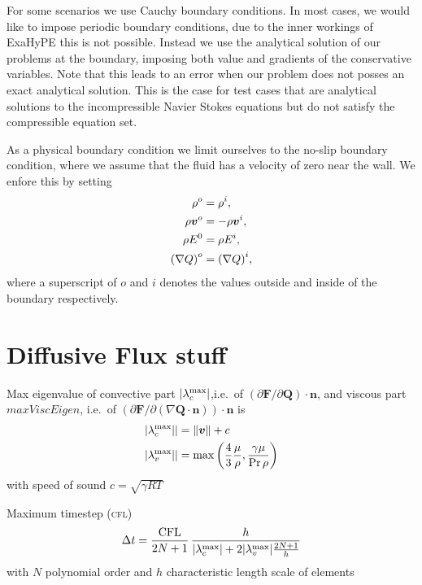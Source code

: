 For some scenarios we use Cauchy boundary conditions.
In most cases, we would like to impose periodic boundary conditions, due to the inner workings of ExaHyPE this is not possible.
Instead we use the analytical solution of our problems at the boundary, imposing both value and gradients of the conservative variables.
Note that this leads to an error when our problem does not posses an exact analytical solution.
This is the case for test cases that are analytical solutions to the incompressible Navier Stokes equations but do not satisfy the compressible equation set.

As a physical boundary condition we limit ourselves to the no-slip boundary condition, where we assume that the fluid has a velocity of zero near the wall.
We enfore this by setting
\begin{align}
  \label{eq:no-slip}
  \begin{split}
  \rho^o &= \rho^i, \\
  \rho \bm{v}^o &= -\rho \bm{v}^i, \\
  \rho E^0 &= \rho E^i,\\
  {(\nabla Q)}^o &= {(\nabla Q)}^i,
  \end{split}
\end{align}
where a superscript of $o$ and $i$ denotes the values outside and inside of the boundary respectively.


\section{Diffusive Flux stuff}
Max eigenvalue of convective part $\vert \lambda_c^{\text{max}} \vert$,i.e.\ of $\left( \partial \bm{F}/\partial \bm{Q}\right) \cdot \bm{n}$,
and viscous part $maxViscEigen$, i.e.\ of $\left( \partial \bm{F}/\partial \left( \nabla \bm{Q} \cdot \bm{n} \right)\right) \cdot \bm{n}$
is
\begin{align}
  \vert \lambda_c^{\text{max}} \vert \vert  &= \Vert \bm{v} \Vert + c\\
  \vert \lambda_v^{\text{max}} \vert \vert &= \max \left( \frac{4}{3} \frac{\mu}{\rho}
                                       , \frac{\gamma \mu}{\Pr \rho} \right)
\end{align}
with speed of sound $c = \sqrt{\gamma R T }$

Maximum timestep (\textsc{cfl})
\begin{equation}
 \Delta t = \frac{\text{CFL}}{2N + 1} \, \frac{h}{\vert \lambda_c^{\text{max}} \vert + 2 \vert \lambda_v^{\text{max}} \vert \frac{2N+1}{h}}
\end{equation}
with $N$ polynomial order and $h$ characteristic length scale of elements

